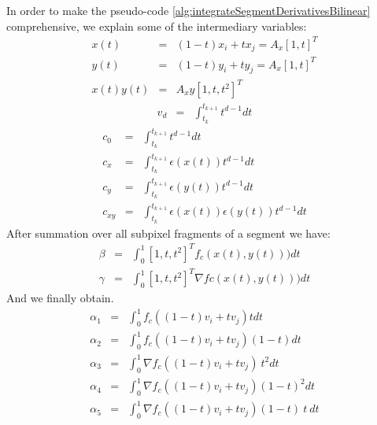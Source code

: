 \documentclass[11pt]{article}
\begin{document}
In order to make the pseudo-code \ref{alg:integrateSegmentDerivativesBilinear} comprehensive, we explain some of the intermediary variables: 
\begin{eqnarray}
x(t)&=& (1-t)x_i + tx_j=A_x[1,t]^T\nonumber\\
y(t)&=& (1-t)y_i + ty_j=A_x[1,t]^T\nonumber\\
x(t)y(t)&=&A_xy[1,t,t^2]^T \label{eqn:xtyt}
\end{eqnarray}
\begin{eqnarray}
v_d&=&\int_{t_{k}}^{t_{k+1}} t^{d-1} dt  \label{eqn:vd}
\end{eqnarray}
\begin{eqnarray}
c_0&=&\int_{t_k}^{t_{k+1}} t^{d-1} dt \nonumber\\
c_x&=&\int_{t_k}^{t_{k+1}} \epsilon(x(t))t^{d-1} dt\nonumber\\
c_y&=&\int_{t_k}^{t_{k+1}} \epsilon(y(t))t^{d-1} dt\nonumber\\
c_{xy}&=&\int_{t_k}^{t_{k+1}} \epsilon(x(t))\epsilon(y(t))t^{d-1} dt
\label{eqn:cxy}
\end{eqnarray}
 After summation over all subpixel fragments of a segment we have:
\begin{eqnarray}
\beta&=&\int_{0}^1  [1,t,t^2]^T f_c(x(t),y(t))) dt\nonumber\\
\gamma&=&\int_{0}^1 [1,t,t^2]^T \nabla fc(x(t),y(t))) dt
\label{eqn:beta_gamma}
\end{eqnarray}
And we finally obtain.
\begin{eqnarray}
\alpha_1&=&\int_0^1 f_c((1-t)v_i+t v_{j}) t dt\nonumber\\
\alpha_2&=&\int_0^1 f_c((1-t)v_i+t v_{j}) (1-t) dt\nonumber\\
\alpha_3&=&\int_0^1 \nabla { f_c}((1-t)v_i+t v_{j}) ~t^2 dt\nonumber\\
\alpha_4&=&\int_0^1 \nabla { f_c}((1-t)v_i+t v_{j}) (1-t)^2 dt\nonumber\\
\alpha_5&=&\int_0^1 \nabla { f_c}((1-t)v_i+t v_{j}) (1-t)~t ~dt
\label{eqn:alpha}
\end{eqnarray}
      \newpage
      
\end{document}
